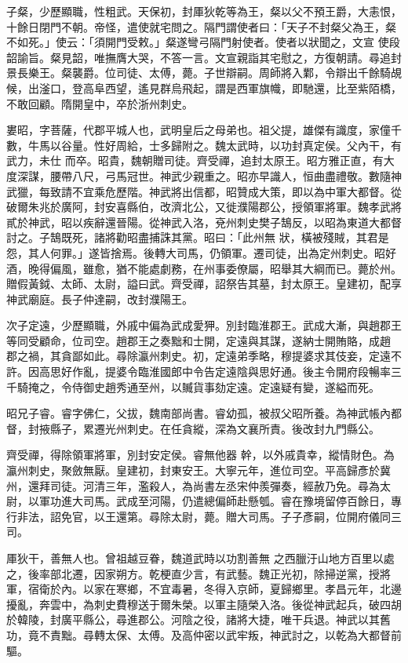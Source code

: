 \begin{pinyinscope}
 子粲，少歷顯職，性粗武。天保初，封厙狄乾等為王，粲以父不預王爵，大恚恨，十餘日閉門不朝。帝怪，遣使就宅問之。隔門謂使者曰：「天子不封粲父為王，粲不如死。」使云：「須開門受敕。」粲遂彎弓隔門射使者。使者以狀聞之，文宣
 使段韶諭旨。粲見韶，唯撫膺大哭，不答一言。文宣親詣其宅慰之，方復朝請。尋追封景長樂王。粲襲爵。位司徒、太傅，薨。子世辯嗣。周師將入鄴，令辯出千餘騎覘候，出滏口，登高阜西望，遙見群烏飛起，謂是西軍旗幟，即馳還，比至紫陌橋，不敢回顧。隋開皇中，卒於浙州刺史。



 婁昭，字菩薩，代郡平城人也，武明皇后之母弟也。祖父提，雄傑有識度，家僮千數，牛馬以谷量。性好周給，士多歸附之。魏太武時，以功封真定侯。父內干，有武力，未仕
 而卒。昭貴，魏朝贈司徒。齊受禪，追封太原王。昭方雅正直，有大度深謀，腰帶八尺，弓馬冠世。神武少親重之。昭亦早識人，恒曲盡禮敬。數隨神武獵，每致請不宜乘危歷階。神武將出信都，昭贊成大策，即以為中軍大都督。從破爾朱兆於廣阿，封安喜縣伯，改濟北公，又徙濮陽郡公，授領軍將軍。魏孝武將貳於神武，昭以疾辭還晉陽。從神武入洛，兗州刺史樊子鵠反，以昭為東道大都督討之。子鵠既死，諸將勸昭盡捕誅其黨。昭曰：「此州無
 狀，橫被殘賊，其君是怨，其人何罪。」遂皆捨焉。後轉大司馬，仍領軍。遷司徒，出為定州刺史。昭好酒，晚得偏風，雖愈，猶不能處劇務，在州事委僚屬，昭舉其大綱而已。薨於州。贈假黃鉞、太師、太尉，謚曰武。齊受禪，詔祭告其墓，封太原王。皇建初，配享神武廟庭。長子仲達嗣，改封濮陽王。



 次子定遠，少歷顯職，外戚中偏為武成愛狎。別封臨淮郡王。武成大漸，與趙郡王等同受顧命，位司空。趙郡王之奏黜和士開，定遠與其謀，遂納士開賄賂，成趙
 郡之禍，其貪鄙如此。尋除瀛州刺史。初，定遠弟季略，穆提婆求其伎妾，定遠不許。因高思好作亂，提婆令臨淮國郎中令告定遠陰與思好通。後主令開府段暢率三千騎掩之，令侍御史趙秀通至州，以贓貨事劾定遠。定遠疑有變，遂縊而死。



 昭兄子睿。睿字佛仁，父拔，魏南部尚書。睿幼孤，被叔父昭所養。為神武帳內都督，封掖縣子，累遷光州刺史。在任貪縱，深為文襄所責。後改封九門縣公。



 齊受禪，得除領軍將軍，別封安定侯。睿無他器
 幹，以外戚貴幸，縱情財色。為瀛州刺史，聚斂無厭。皇建初，封東安王。大寧元年，進位司空。平高歸彥於冀州，還拜司徒。河清三年，濫殺人，為尚書左丞宋仲羨彈奏，經赦乃免。尋為太尉，以軍功進大司馬。武成至河陽，仍遣總偏師赴懸瓠。睿在豫境留停百餘日，專行非法，詔免官，以王還第。尋除太尉，薨。贈大司馬。子子彥嗣，位開府儀同三司。



 厙狄干，善無人也。曾祖越豆眷，魏道武時以功割善無
 之西臘汙山地方百里以處之，後率部北遷，因家朔方。乾梗直少言，有武藝。魏正光初，除掃逆黨，授將軍，宿衛於內。以家在寒鄉，不宜毒暑，冬得入京師，夏歸鄉里。孝昌元年，北邊擾亂，奔雲中，為刺史費穆送于爾朱榮。以軍主隨榮入洛。後從神武起兵，破四胡於韓陵，封廣平縣公，尋進郡公。河陰之役，諸將大捷，唯干兵退。神武以其舊功，竟不責黜。尋轉太保、太傅。及高仲密以武牢叛，神武討之，以乾為大都督前驅。




\end{pinyinscope}
